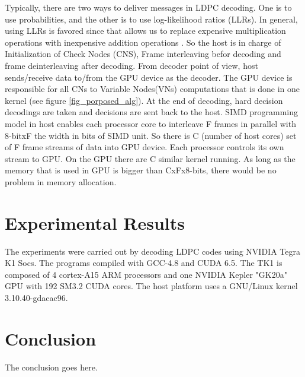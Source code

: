 \documentclass[conference]{IEEEtran}
\begin{document}
Typically, there are two ways to deliver messages in LDPC decoding. One is to use probabilities, and the other is to use log-likelihood ratios (LLRs). In general, using LLRs is favored since that allows us to replace expensive multiplication operations with inexpensive addition operations \cite{art_cuda_openmp}. So the host is in charge of Initialization of Check Nodes (CNS), Frame interleaving befor decoding and frame deinterleaving after decoding. From decoder point of view, host sends/receive data to/from the GPU device as the decoder. The GPU device is responsible for all CNs to Variable Nodes(VNs) computations that is done in one kernel (see figure \ref{fig_porposed_alg}). At the end of decoding, hard decision decodings are taken and decisions are sent back to the host.
SIMD programming model in host enables each processor core to interleave F frames in parallel with 8-bitxF the width in bits of SIMD unit. So there is C (number of host cores) set of F frame streams of data into GPU device. Each processor controls its own stream to GPU. On the GPU there are C similar kernel running. As long as the memory that is used in GPU is bigger than CxFx8-bits, there would be no problem in memory allocation. 



\section{Experimental Results} \label{sec4}

The experiments were carried out by decoding LDPC codes using NVIDIA Tegra K1 Socs. The programs compiled with GCC-4.8 and CUDA 6.5. The TK1 is composed of 4 cortex-A15 ARM processors and one NVIDIA Kepler "GK20a" GPU with 192 SM3.2 CUDA cores. The host platform uses a GNU/Linux kernel 3.10.40-gdacac96. 

\section{Conclusion}
The conclusion goes here.

\newpage






\end{document}
